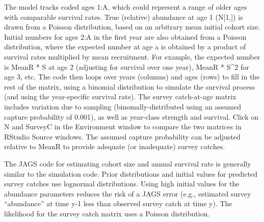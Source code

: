 \documentclass[
]{krantz}
\begin{document}
The model tracks coded ages 1:A, which could represent a range of older ages with comparable survival rates. True (relative) abundance at age 1 (N{[}1,{]}) is drawn from a Poisson distribution, based on an arbitrary mean initial cohort size. Initial numbers for ages 2:A in the first year are also obtained from a Poisson distribution, where the expected number at age a is obtained by a product of survival rates multiplied by mean recruitment. For example, the expected number is MeanR * S at age 2 (adjusting for survival over one year), MeanR * S\^{}2 for age 3, etc. The code then loops over years (columns) and ages (rows) to fill in the rest of the matrix, using a binomial distribution to simulate the survival process (and using the year-specific survival rate). The survey catch-at-age matrix includes variation due to sampling (binomally-distributed using an assumed capture probability of 0.001), as well as year-class strength and survival. Click on N and SurveyC in the Environment window to compare the two matrices in RStudio Source windows. The assumed capture probability can be adjusted relative to MeanR to provide adequate (or inadequate) survey catches.

The JAGS code for estimating cohort size and annual survival rate is generally similar to the simulation code. Prior distributions and initial values for predicted survey catches use lognormal distributions. Using high initial values for the abundance parameters reduces the risk of a JAGS error (e.g., estimated survey ``abundance'' at time y-1 less than observed survey catch at time y). The likelihood for the survey catch matrix uses a Poisson distribution.
\end{document}

